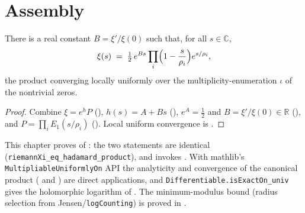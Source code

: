 \section{Assembly}
\label{sec:hf_main}

\begin{theorem}
\label{thm:hf_hadamard}
\leanok
{}
There is a real constant $B=\xi'/\xi(0)$ such that, for all $s\in\mathbb C$,
\[
  \xi(s)\;=\;\tfrac12\,e^{Bs}\prod_i\Bigl(1-\frac s{\rho_i}\Bigr)e^{s/\rho_i},
\]
the product converging locally uniformly over the multiplicity-enumeration $\iota$
of the nontrivial zeros.
\end{theorem}

\begin{proof}
\leanok
{}
Combine $\xi=e^{h}P$ (), $h(s)=A+Bs$ (),
$e^{A}=\tfrac12$ and $B=\xi'/\xi(0)\in\mathbb R$ (), and
$P=\prod_iE_1(s/\rho_i)$ (). Local uniform convergence is
.
\end{proof}

\begin{remark}
This chapter proves  of : the two
statements are identical (\texttt{riemannXi\_eq\_hadamard\_product}),
and  invokes . With
mathlib's \texttt{MultipliableUniformlyOn} API the analyticity and convergence of the
canonical product ( and ) are direct
applications, and \texttt{Differentiable.isExactOn\_univ} gives the holomorphic
logarithm of . The minimum-modulus bound 
(radius selection from Jensen/\texttt{logCounting}) is proved in .
\end{remark}
